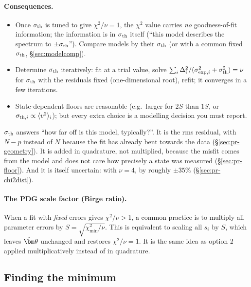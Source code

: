 \documentclass[11pt,a4paper]{article}
\numberwithin{equation}{section}
\theoremstyle{definition}
\theoremstyle{plain}
\theoremstyle{remark}
\newenvironment{plainwords}[1][In plain words]{\begin{tcolorbox}[plainbox,title={\small\bfseries #1},fonttitle=\small,coltitle=white,colbacktitle=ForestGreen!60!black]}{\end{tcolorbox}}
\numberwithin{algorithm}{section}
\newcommand{\vth}{\bm\theta}
\begin{document}
\paragraph{Consequences.}
\begin{itemize}[leftmargin=1.3em,itemsep=2pt]
\item Once $\sigma_{\rm th}$ is tuned to give $\chi^2/\nu=1$, the $\chi^2$ value carries \emph{no} goodness-of-fit information; the information is in $\sigma_{\rm th}$ itself (``this model describes the spectrum to $\pm\sigma_{\rm th}$''). Compare models by their $\sigma_{\rm th}$ (or with a common fixed $\sigma_{\rm th}$, \S\ref{sec:modelcomp}).
\item Determine $\sigma_{\rm th}$ iteratively: fit at a trial value, solve $\sum_i\Delta_i^2/(\sigma_{{\rm exp},i}^2+\sigma_{\rm th}^2)=\nu$ for $\sigma_{\rm th}$ with the residuals fixed (one-dimensional root), refit; it converges in a few iterations.
\item State-dependent floors are reasonable (e.g.\ larger for $2S$ than $1S$, or $\sigma_{{\rm th},i}\propto\langle v^2\rangle_i$); but every extra choice is a modelling decision you must report.
\end{itemize}
\begin{plainwords}[In plain words]
$\sigma_{\rm th}$ answers ``how far off is this model, typically?''. It is the rms residual, with $N-p$ instead of $N$ because the fit has already bent towards the data (\S\ref{sec:pr-geometry}). It is added in quadrature, not multiplied, because the misfit comes from the model and does not care how precisely a state was measured (\S\ref{sec:pr-floor}). And it is itself uncertain: with $\nu=4$, by roughly $\pm35\%$ (\S\ref{sec:pr-chi2dist}).
\end{plainwords}

\paragraph{The PDG scale factor (Birge ratio).} When a fit with \emph{fixed} errors gives $\chi^2/\nu>1$, a common practice is to multiply all parameter errors by $S=\sqrt{\chi^2_{\min}/\nu}$. This is equivalent to scaling all $s_i$ by $S$, which leaves $\hat\vth$ unchanged and restores $\chi^2/\nu=1$. It is the same idea as option 2 applied multiplicatively instead of in quadrature.

\subsection{Finding the minimum}\label{sec:minimize}
\end{document}
